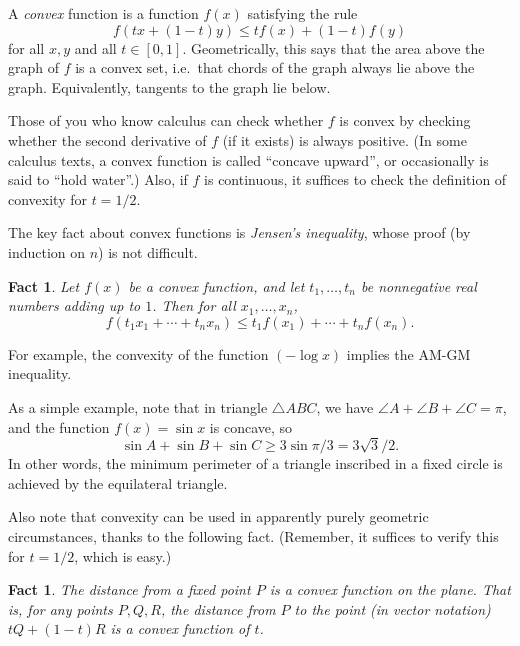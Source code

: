 \documentclass[12pt]{book}
\numberwithin{exc}{section}
\numberwithin{figure}{section}
\newtheorem{fact}[theorem]{Fact}
\numberwithin{equation}{theorem}
\begin{document}
A \emph{convex} function is a function $f(x)$ satisfying the rule
\[
f(tx + (1-t)y) \leq tf(x) + (1-t)f(y)
\]
for all $x,y$ and all $t \in [0,1]$. Geometrically, this says that the 
area above the graph of $f$ is a convex set, i.e.\ that chords of the 
graph always lie above the graph. Equivalently, tangents to the graph 
lie below.

Those of you who know calculus can check whether $f$ is convex by 
checking whether the second derivative of $f$ (if it exists) is always positive. 
(In some calculus texts, a convex function is called ``concave 
upward'', or occasionally is said to ``hold water''.) Also, if $f$ is 
continuous, it suffices to check the definition of convexity for 
$t=1/2$.

The key fact about convex functions is \emph{Jensen's inequality}, 
 
whose proof (by induction on $n$) is not difficult.
\begin{fact}
Let $f(x)$ be a convex function, and let $t_{1}, \dots, t_{n}$ be 
nonnegative real numbers adding up to $1$. Then for all $x_{1}, \dots, 
x_{n}$,
\[
f(t_{1}x_{1} + \cdots + t_{n}x_{n}) \leq t_{1}f(x_{1}) + \cdots + 
t_{n}f(x_{n}).
\]
\end{fact}
For example, the convexity of the function $(-\log x)$ implies the 
AM-GM inequality.

As a simple example, note that in triangle 
$\triangle ABC$, we have $\angle A + \angle B
+ \angle C = \pi$, and the function $f(x) = \sin x$ is concave, so
\[
\sin A + \sin B + \sin C \geq 3 \sin \pi/3 = 3\sqrt{3}/2.
\]
In other words, the minimum perimeter of a triangle inscribed in a fixed
circle is achieved by the equilateral triangle.

Also note that convexity can be used in apparently purely geometric 
circumstances, thanks to the following fact. (Remember, it suffices to 
verify this for $t=1/2$, which is easy.)
\begin{fact}
The distance from a fixed point $P$ is a convex function on the plane. 
That is, for any points $P,Q,R$, the distance from $P$ to the point 
(in vector notation) $tQ + (1-t)R$ is a convex function of $t$.
\end{fact}
\end{document}
